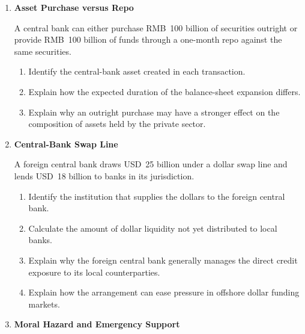 \begin{enumerate}
\begin{enumerate}
\item Show how this pricing structure can create a partial automatic exit mechanism.

\end{enumerate}

\item \textbf{Asset Purchase versus Repo}

A central bank can either purchase RMB~100 billion of securities outright or provide RMB~100 billion of funds through a one-month repo against the same securities.

\begin{enumerate}

\item Identify the central-bank asset created in each transaction.

\item Explain how the expected duration of the balance-sheet expansion differs.

\item Explain why an outright purchase may have a stronger effect on the composition of assets held by the private sector.

\end{enumerate}

\item \textbf{Central-Bank Swap Line}

A foreign central bank draws USD~25 billion under a dollar swap line and lends USD~18 billion to banks in its jurisdiction.

\begin{enumerate}

\item Identify the institution that supplies the dollars to the foreign central bank.

\item Calculate the amount of dollar liquidity not yet distributed to local banks.

\item Explain why the foreign central bank generally manages the direct credit exposure to its local counterparties.

\item Explain how the arrangement can ease pressure in offshore dollar funding markets.

\end{enumerate}

\item \textbf{Moral Hazard and Emergency Support}


\end{enumerate}
